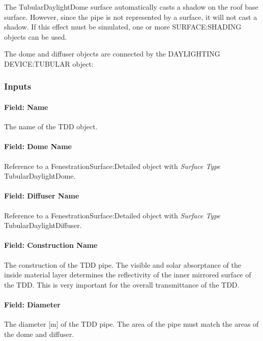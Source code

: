 The TubularDaylightDome surface automatically casts a shadow on the roof base surface. However, since the pipe is not represented by a surface, it will not cast a shadow. If this effect must be simulated, one or more SURFACE:SHADING objects can be used.

The dome and diffuser objects are connected by the DAYLIGHTING DEVICE:TUBULAR object:

\subsubsection{Inputs}\label{inputs-6-005}

\paragraph{Field: Name}\label{field-name-3-007}

The name of the TDD object.

\paragraph{Field: Dome Name}\label{field-dome-name}

Reference to a FenestrationSurface:Detailed object with \emph{Surface Type} TubularDaylightDome.

\paragraph{Field: Diffuser Name}\label{field-diffuser-name}

Reference to a FenestrationSurface:Detailed object with \emph{Surface Type} TubularDaylightDiffuser.

\paragraph{Field: Construction Name}\label{field-construction-name-001}

The construction of the TDD pipe. The visible and solar absorptance of the inside material layer determines the reflectivity of the inner mirrored surface of the TDD. This is very important for the overall transmittance of the TDD.

\paragraph{Field: Diameter}\label{field-diameter}

The diameter {[}m{]} of the TDD pipe. The area of the pipe must match the areas of the dome and diffuser.

